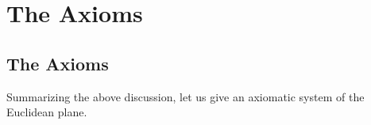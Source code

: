 \chapter{The Axioms}
\label{chap:axioms}


\section*{The Axioms}
\label{def:birkhoff-axioms} 

Summarizing the above discussion, let us give an axiomatic system of the Euclidean plane.


\bigskip 

